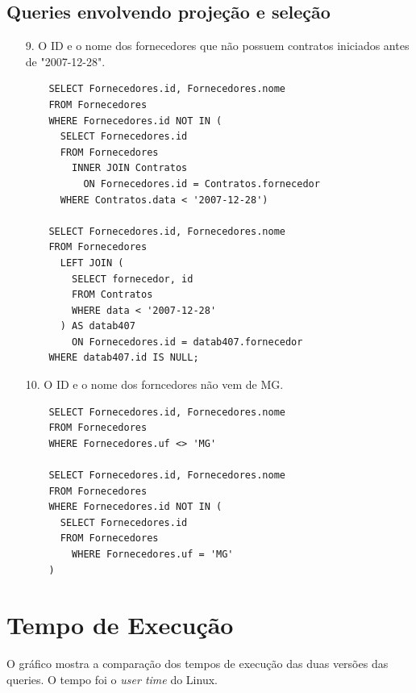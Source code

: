 \documentclass{article}
\begin{document}
\subsection{Queries envolvendo projeção e seleção}
\begin{itemize}
\item[9.] O ID e o nome dos fornecedores que não possuem contratos iniciados antes de "2007-12-28".
  \begin{verbatim}
    SELECT Fornecedores.id, Fornecedores.nome
    FROM Fornecedores
    WHERE Fornecedores.id NOT IN (
      SELECT Fornecedores.id
      FROM Fornecedores
        INNER JOIN Contratos
          ON Fornecedores.id = Contratos.fornecedor
      WHERE Contratos.data < '2007-12-28')
      
    SELECT Fornecedores.id, Fornecedores.nome
    FROM Fornecedores
      LEFT JOIN (
        SELECT fornecedor, id
        FROM Contratos
        WHERE data < '2007-12-28'
      ) AS datab407
        ON Fornecedores.id = datab407.fornecedor 
    WHERE datab407.id IS NULL;
    \end{verbatim}
\item[10.] O ID e o nome dos forncedores não vem de MG.
  \begin{verbatim}
    SELECT Fornecedores.id, Fornecedores.nome
    FROM Fornecedores
    WHERE Fornecedores.uf <> 'MG'

    SELECT Fornecedores.id, Fornecedores.nome
    FROM Fornecedores
    WHERE Fornecedores.id NOT IN (
      SELECT Fornecedores.id
      FROM Fornecedores
	    WHERE Fornecedores.uf = 'MG'
    )

    \end{verbatim}
\end{itemize}

\section{Tempo de Execução}
O gráfico mostra a comparação dos tempos de execução das duas versões das queries.
O tempo foi o \textit{user time} do Linux.
\begin{figure}[H]
  \begin{center}  
        
  \end{center}  
  \label{fig:graph}
\end{figure}
\end{document}
